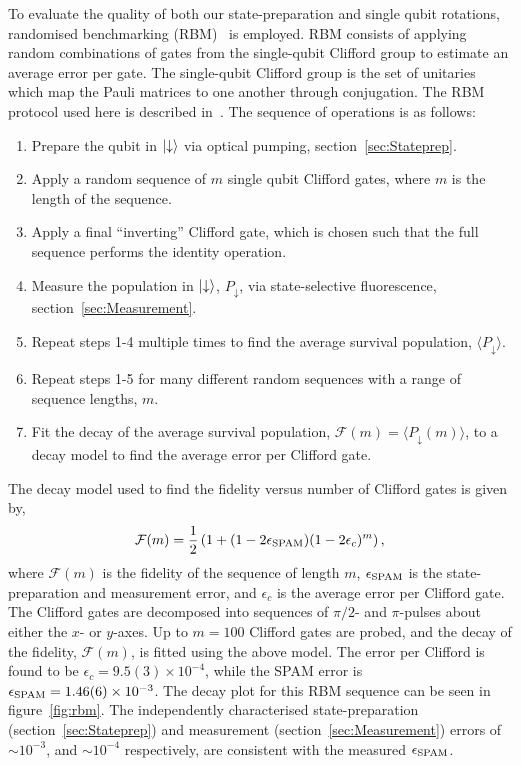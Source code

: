     To evaluate the quality of both our
    state-preparation and single qubit rotations, randomised benchmarking
    (RBM)~\cite{knill2008randomized} is employed.  RBM consists of
    applying random combinations of gates from the single-qubit Clifford group to
    estimate an average error per gate. The single-qubit Clifford group is
    the set of unitaries which map the Pauli matrices to one another through
    conjugation. The RBM protocol used here is described in~\cite{hughes2021benchmarking}.
    The sequence of operations is as follows:
    \begin{enumerate}
        \item Prepare the qubit in $\ket{\downarrow}$ via optical pumping, section~\ref{sec:Stateprep}.
        \item Apply a random sequence of $m$ single qubit Clifford gates, where $m$ is the length of the sequence.
        \item Apply a final ``inverting'' Clifford gate, which is chosen such that the full sequence performs the identity operation.
        \item Measure the population in $\ket{\downarrow}$, $P_\downarrow$, via state-selective fluorescence, section~\ref{sec:Measurement}.
        \item Repeat steps 1-4 multiple times to find the average survival population, $\langle P_\downarrow \rangle$.
        \item Repeat steps 1-5 for many different random sequences with a range of sequence lengths, $m$.
        \item Fit the decay of the average survival population, $\mathcal{F}(m) = \langle P_\downarrow(m) \rangle$, to a decay model to find the average error per Clifford gate.
    \end{enumerate}
    The decay model used to find 
    the fidelity versus number of Clifford gates is given by\cite{hughes2021benchmarking},
    \begin{equation}
    \label{eq:RBM_decay}
        \mathcal{F}(m) = \frac{1}{2}\left( 1+(1-2\epsilon_{\rm SPAM})(1-2\epsilon_c)^m\right),
    \end{equation}
    where $\mathcal{F}(m)$ is the fidelity of the sequence of length $m$,
    $\epsilon_{\rm SPAM}$ is the state-preparation and measurement error, and
    $\epsilon_c$ is the average error per Clifford gate.  The Clifford gates are decomposed into
    sequences of $\pi/2$- and $\pi$-pulses about either the $x$- or $y$-axes. Up to $m=100$ Clifford gates are probed, and the decay of the fidelity, $\mathcal{F}(m)$, is fitted using the above model.
    The error per Clifford is found to be $\epsilon_c = 9.5(3) \times 10^{-4}$,
    while the SPAM error is $\epsilon_{\rm SPAM} = 1.46(6) \times 10^{-3}$. The decay plot for
    this RBM sequence can be seen in figure~\ref{fig:rbm}.
    The independently characterised state-preparation (section~\ref{sec:Stateprep}) and measurement (section~\ref{sec:Measurement}) errors of $\sim 10^{-3}$, and $\sim 10^{-4}$ respectively, are consistent with the measured $\epsilon_{\rm SPAM}$.

